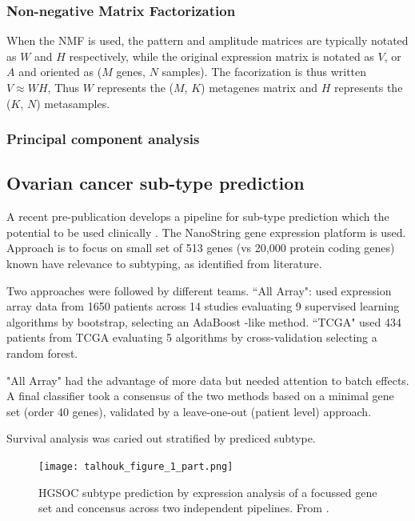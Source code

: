 \documentclass[draft, tikz, 12pt,a4paper,oneside,fleqn]{article}
\begin{document}
\subsubsection{Non-negative Matrix Factorization}

When the NMF is used, the pattern and amplitude matrices are typically notated as $W$ and $H$ respectively, while the original expression matrix is notated as $V$, or $A$ and oriented as ($M$ genes, $N$ samples).   The facorization is thus written $V \approx W H$, Thus $W$ represents the ($M$, $K$) metagenes matrix and $H$ represents the ($K$, $N$) metasamples.

\subsubsection{Principal component analysis}

\subsection{Ovarian cancer sub-type prediction}

A recent pre-publication develops a pipeline for sub-type prediction which the potential to be used clinically \cite{Talhouk2020}.
The NanoString gene expression platform is used. Approach is to focus on small set of 513 genes (vs 20,000 protein coding genes) known have relevance to subtyping, as identified from literature.

Two approaches were followed by different teams.  ``All Array": used expression array data from 1650 patients across 14 studies evaluating 9 supervised learning algorithms by bootstrap, selecting an AdaBoost -like method. ``TCGA" used 434 patients from TCGA evaluating 5 algorithms by cross-validation selecting a random forest.

"All Array" had the advantage of more data but needed attention to batch effects. A final classifier took a consensus of the two methods based on a minimal gene set (order 40 genes), validated by a leave-one-out (patient level) approach.

Survival analysis was caried out stratified by prediced subtype.


\begin{figure}
\begin{center}
\texttt{[image: talhouk\_figure\_1\_part.png]}
\end{center}
\caption{HGSOC subtype prediction by expression analysis of a focussed gene set and concensus across two independent pipelines.  From \cite{Talhouk2020}.}
\label{fig-talhouk_figure_1_part.png}
\end{figure}
\end{document}
